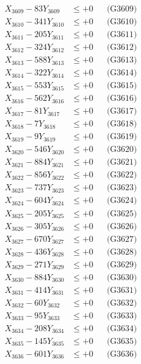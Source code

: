 \documentclass[a4paper,10pt]{article}
\begin{document}
{\begin{align}
X_{3609} - 83Y_{3609} &\leq +0 && \text{(G3609)} \\
X_{3610} - 341Y_{3610} &\leq +0 && \text{(G3610)} \\
\allowbreak
X_{3611} - 205Y_{3611} &\leq +0 && \text{(G3611)} \\
X_{3612} - 324Y_{3612} &\leq +0 && \text{(G3612)} \\
X_{3613} - 588Y_{3613} &\leq +0 && \text{(G3613)} \\
X_{3614} - 322Y_{3614} &\leq +0 && \text{(G3614)} \\
X_{3615} - 553Y_{3615} &\leq +0 && \text{(G3615)} \\
X_{3616} - 562Y_{3616} &\leq +0 && \text{(G3616)} \\
X_{3617} - 81Y_{3617} &\leq +0 && \text{(G3617)} \\
X_{3618} - 7Y_{3618} &\leq +0 && \text{(G3618)} \\
X_{3619} - 9Y_{3619} &\leq +0 && \text{(G3619)} \\
X_{3620} - 546Y_{3620} &\leq +0 && \text{(G3620)} \\
\allowbreak
X_{3621} - 884Y_{3621} &\leq +0 && \text{(G3621)} \\
X_{3622} - 856Y_{3622} &\leq +0 && \text{(G3622)} \\
X_{3623} - 737Y_{3623} &\leq +0 && \text{(G3623)} \\
X_{3624} - 604Y_{3624} &\leq +0 && \text{(G3624)} \\
X_{3625} - 205Y_{3625} &\leq +0 && \text{(G3625)} \\
X_{3626} - 305Y_{3626} &\leq +0 && \text{(G3626)} \\
X_{3627} - 670Y_{3627} &\leq +0 && \text{(G3627)} \\
X_{3628} - 436Y_{3628} &\leq +0 && \text{(G3628)} \\
X_{3629} - 271Y_{3629} &\leq +0 && \text{(G3629)} \\
X_{3630} - 884Y_{3630} &\leq +0 && \text{(G3630)} \\
\allowbreak
X_{3631} - 414Y_{3631} &\leq +0 && \text{(G3631)} \\
X_{3632} - 60Y_{3632} &\leq +0 && \text{(G3632)} \\
X_{3633} - 95Y_{3633} &\leq +0 && \text{(G3633)} \\
X_{3634} - 208Y_{3634} &\leq +0 && \text{(G3634)} \\
X_{3635} - 145Y_{3635} &\leq +0 && \text{(G3635)} \\
X_{3636} - 601Y_{3636} &\leq +0 && \text{(G3636)} \\

\end{align}}
\end{document}
